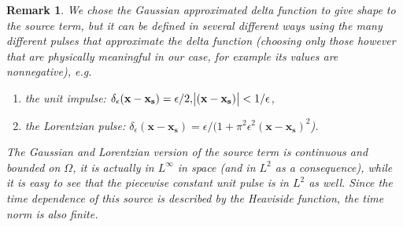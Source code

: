 \documentclass[11pt]{article}
\newtheorem{remark}{Remark}
\begin{document}
\begin{remark}
\normalfont We chose the Gaussian approximated delta function to give shape to the source term, but it can be defined in several different ways using the many different pulses that approximate the delta function (choosing only those however that are physically meaningful in our case, for example its values are nonnegative), e.g.

\begin{enumerate}
\item the unit impulse: $\delta_\epsilon (\mathbf{x}-\mathbf{x_s}) = \epsilon/2, \abs{(\mathbf{x}-\mathbf{x_s})} < 1/\epsilon $,
\item the Lorentzian pulse: $\delta_\epsilon (\mathbf{x}-\mathbf{x_s}) = \epsilon / (1 + \pi^2 \epsilon^2 (\mathbf{x}-\mathbf{x_s})^2$).
\end{enumerate}

The Gaussian and Lorentzian version of the source term is continuous and bounded on $\Omega$, it is actually in $L^\infty$ in space (and in $L^2$ as a consequence), while it is easy to see that the piecewise constant unit pulse is in $L^2$ as well. Since the time dependence of this source is described by the Heaviside function, the time norm is also finite.

\end{remark}
\end{document}
